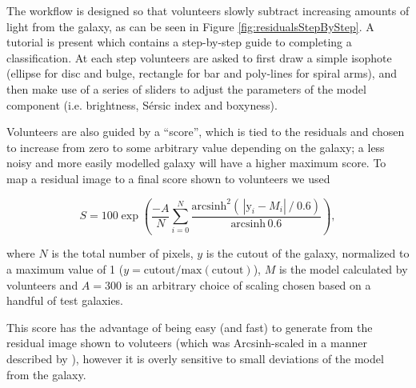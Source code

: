 \documentclass[../main.tex]{subfiles}
\begin{document}
The workflow is designed so that volunteers slowly subtract increasing amounts of light from the galaxy, as can be seen in Figure \ref{fig:residualsStepByStep}. A tutorial is present which contains a step-by-step guide to completing a classification. At each step volunteers are asked to first draw a simple isophote (ellipse for disc and bulge, rectangle for bar and poly-lines for spiral arms), and then make use of a series of sliders to adjust the parameters of the model component (i.e. brightness, S\'ersic index and boxyness).

Volunteers are also guided by a ``score'', which is tied to the residuals and chosen to increase from zero to some arbitrary value depending on the galaxy; a less noisy and more easily modelled galaxy will have a higher maximum score. To map a residual image to a final score shown to volunteers we used

\begin{equation}
    S = 100 \exp\left(\frac{-A}{N}\sum_{i=0}^N\frac{\text{arcsinh}^2\left(\,|\text{y}_i - M_i|\ /\ 0.6\right)}{\text{arcsinh}\,0.6 }\right),
\end{equation}

where $N$ is the total number of pixels, $y$ is the cutout of the galaxy, normalized to a maximum value of 1 ($y = \text{cutout}/\text{max}(\text{cutout})$), $M$ is the model calculated by volunteers and $A=300$ is an arbitrary choice of scaling chosen based on a handful of test galaxies.

This score has the advantage of being easy (and fast) to generate from the residual image shown to voluteers (which was Arcsinh-scaled in a manner described by \citealt{Lupton2003:astro-ph/0312483v1}), however it is overly sensitive to small deviations of the model from the galaxy.

\end{document}
